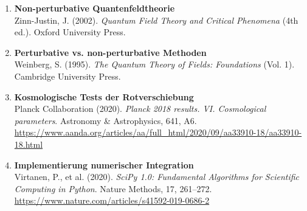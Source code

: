\begin{enumerate}
		\item \textbf{Non-perturbative Quantenfeldtheorie} \\
		Zinn-Justin, J. (2002). \textit{Quantum Field Theory and Critical Phenomena} (4th ed.). Oxford University Press.
		
		\item \textbf{Perturbative vs. non-perturbative Methoden} \\
		Weinberg, S. (1995). \textit{The Quantum Theory of Fields: Foundations} (Vol. 1). Cambridge University Press.
		
		\item \textbf{Kosmologische Tests der Rotverschiebung} \\
		Planck Collaboration (2020). \textit{Planck 2018 results. VI. Cosmological parameters}. Astronomy \& Astrophysics, 641, A6.\\
		\url{https://www.aanda.org/articles/aa/full_html/2020/09/aa33910-18/aa33910-18.html}
		
		\item \textbf{Implementierung numerischer Integration} \\
		Virtanen, P., et al. (2020). \textit{SciPy 1.0: Fundamental Algorithms for Scientific Computing in Python}. Nature Methods, 17, 261–272.\\
		\url{https://www.nature.com/articles/s41592-019-0686-2}
	\end{enumerate}
	